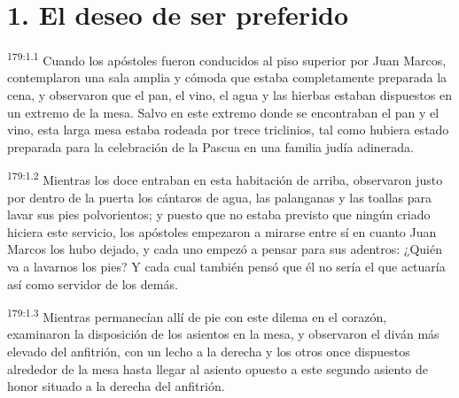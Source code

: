 \section*{1. El deseo de ser preferido}
\par 
\textsuperscript{179:1.1} Cuando los apóstoles fueron conducidos al piso superior por Juan Marcos, contemplaron una sala amplia y cómoda que estaba completamente preparada la cena, y observaron que el pan, el vino, el agua y las hierbas estaban dispuestos en un extremo de la mesa. Salvo en este extremo donde se encontraban el pan y el vino, esta larga mesa estaba rodeada por trece triclinios, tal como hubiera estado preparada para la celebración de la Pascua en una familia judía adinerada.

\par 
\textsuperscript{179:1.2} Mientras los doce entraban en esta habitación de arriba, observaron justo por dentro de la puerta los cántaros de agua, las palanganas y las toallas para lavar sus pies polvorientos; y puesto que no estaba previsto que ningún criado hiciera este servicio, los apóstoles empezaron a mirarse entre sí en cuanto Juan Marcos los hubo dejado, y cada uno empezó a pensar para sus adentros: ¿Quién va a lavarnos los pies? Y cada cual también pensó que él no sería el que actuaría así como servidor de los demás.

\par 
\textsuperscript{179:1.3} Mientras permanecían allí de pie con este dilema en el corazón, examinaron la disposición de los asientos en la mesa, y observaron el diván más elevado del anfitrión, con un lecho a la derecha y los otros once dispuestos alrededor de la mesa hasta llegar al asiento opuesto a este segundo asiento de honor situado a la derecha del anfitrión.

